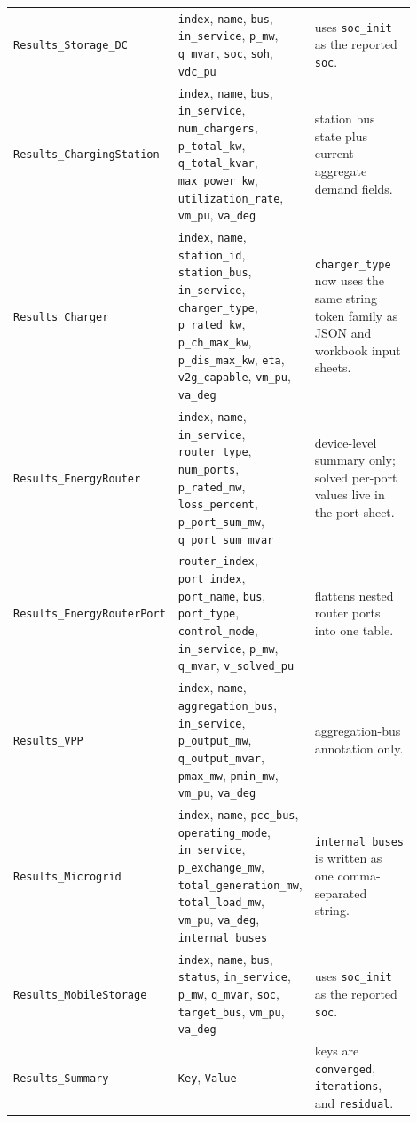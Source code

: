 \begin{longtable}{L{0.20\linewidth}L{0.48\linewidth}L{0.22\linewidth}}
\texttt{Results\_Storage\_DC} & \texttt{index}, \texttt{name}, \texttt{bus}, \texttt{in\_service}, \texttt{p\_mw}, \texttt{q\_mvar}, \texttt{soc}, \texttt{soh}, \texttt{vdc\_pu} & uses \texttt{soc\_init} as the reported \texttt{soc}. \\
\texttt{Results\_ChargingStation} & \texttt{index}, \texttt{name}, \texttt{bus}, \texttt{in\_service}, \texttt{num\_chargers}, \texttt{p\_total\_kw}, \texttt{q\_total\_kvar}, \texttt{max\_power\_kw}, \texttt{utilization\_rate}, \texttt{vm\_pu}, \texttt{va\_deg} & station bus state plus current aggregate demand fields. \\
\texttt{Results\_Charger} & \texttt{index}, \texttt{name}, \texttt{station\_id}, \texttt{station\_bus}, \texttt{in\_service}, \texttt{charger\_type}, \texttt{p\_rated\_kw}, \texttt{p\_ch\_max\_kw}, \texttt{p\_dis\_max\_kw}, \texttt{eta}, \texttt{v2g\_capable}, \texttt{vm\_pu}, \texttt{va\_deg} & \texttt{charger\_type} now uses the same string token family as JSON and workbook input sheets. \\
\texttt{Results\_EnergyRouter} & \texttt{index}, \texttt{name}, \texttt{in\_service}, \texttt{router\_type}, \texttt{num\_ports}, \texttt{p\_rated\_mw}, \texttt{loss\_percent}, \texttt{p\_port\_sum\_mw}, \texttt{q\_port\_sum\_mvar} & device-level summary only; solved per-port values live in the port sheet. \\
\texttt{Results\_EnergyRouterPort} & \texttt{router\_index}, \texttt{port\_index}, \texttt{port\_name}, \texttt{bus}, \texttt{port\_type}, \texttt{control\_mode}, \texttt{in\_service}, \texttt{p\_mw}, \texttt{q\_mvar}, \texttt{v\_solved\_pu} & flattens nested router ports into one table. \\
\texttt{Results\_VPP} & \texttt{index}, \texttt{name}, \texttt{aggregation\_bus}, \texttt{in\_service}, \texttt{p\_output\_mw}, \texttt{q\_output\_mvar}, \texttt{pmax\_mw}, \texttt{pmin\_mw}, \texttt{vm\_pu}, \texttt{va\_deg} & aggregation-bus annotation only. \\
\texttt{Results\_Microgrid} & \texttt{index}, \texttt{name}, \texttt{pcc\_bus}, \texttt{operating\_mode}, \texttt{in\_service}, \texttt{p\_exchange\_mw}, \texttt{total\_generation\_mw}, \texttt{total\_load\_mw}, \texttt{vm\_pu}, \texttt{va\_deg}, \texttt{internal\_buses} & \texttt{internal\_buses} is written as one comma-separated string. \\
\texttt{Results\_MobileStorage} & \texttt{index}, \texttt{name}, \texttt{bus}, \texttt{status}, \texttt{in\_service}, \texttt{p\_mw}, \texttt{q\_mvar}, \texttt{soc}, \texttt{target\_bus}, \texttt{vm\_pu}, \texttt{va\_deg} & uses \texttt{soc\_init} as the reported \texttt{soc}. \\
\texttt{Results\_Summary} & \texttt{Key}, \texttt{Value} & keys are \texttt{converged}, \texttt{iterations}, and \texttt{residual}. \\
\bottomrule
\end{longtable}


